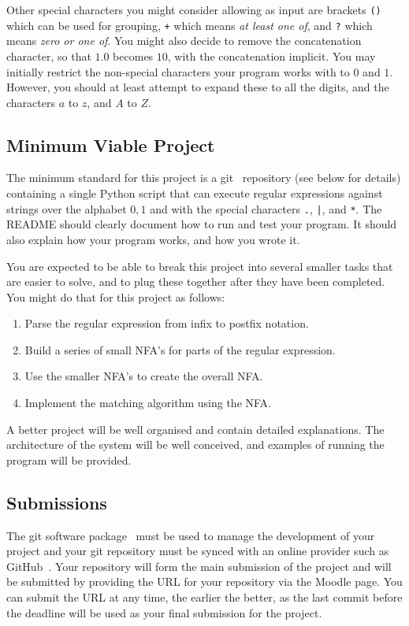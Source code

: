 \documentclass[12pt, a4paper]{article}
\begin{document}
Other special characters you might consider allowing as input are brackets \texttt{()} which can be used for grouping, \texttt{+} which means \emph{at least one of}, and \texttt{?} which means \emph{zero or one of}. 
You might also decide to remove the concatenation character, so that $1.0$ becomes $10$, with the concatenation implicit.
You may initially restrict the non-special characters your program works with to $0$ and $1$.
However, you should at least attempt to expand these to all the digits, and the characters $a$ to $z$, and $A$ to $Z$.

\subsection*{Minimum Viable Project}

The minimum standard for this project is a git~\cite{git} repository (see below for details) containing a single Python script that can execute regular expressions against strings over the alphabet ${0,1}$ and with the special characters \texttt{.}, \texttt{|}, and \texttt{*}.
The README should clearly document how to run and test your program.
It should also explain how your program works, and how you wrote it.

You are expected to be able to break this project into several smaller tasks that are easier to solve, and to plug these together after they have been completed.
You might do that for this project as follows:
\begin{enumerate}
  \item Parse the regular expression from infix to postfix notation.
  \item Build a series of small NFA's for parts of the regular expression.
  \item Use the smaller NFA's to create the overall NFA.
  \item Implement the matching algorithm using the NFA.
\end{enumerate}

A better project will be well organised and contain detailed explanations.
The architecture of the system will be well conceived, and examples of running the program will be provided.


\subsection*{Submissions}
The git software package~\cite{git} must be used to manage the development of your project and your git repository must be synced with an online provider such as GitHub~\cite{github}.
Your repository will form the main submission of the project and will be submitted by providing the URL for your repository via the Moodle page.
You can submit the URL at any time, the earlier the better, as the last commit before the deadline will be used as your final submission for the project.
\end{document}
